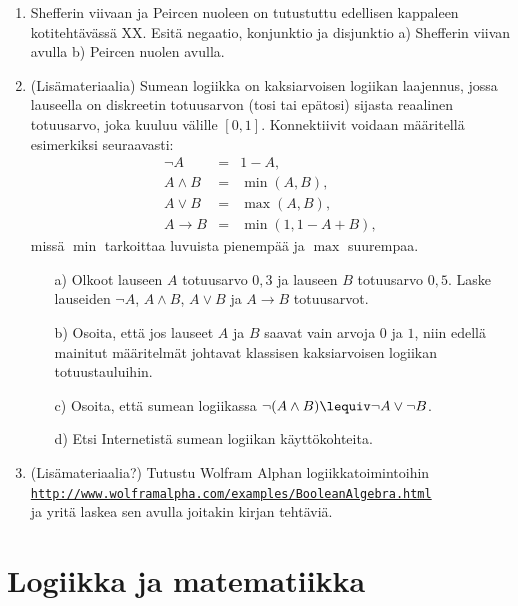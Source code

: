 \begin{enumerate}
\item Shefferin viivaan ja Peircen nuoleen on tutustuttu
edellisen kappaleen kotitehtävässä XX. Esitä negaatio,
konjunktio ja disjunktio a) Shefferin viivan avulla b)
Peircen nuolen avulla.

\item (Lisämateriaalia) Sumean logiikka on kaksiarvoisen logiikan
laajennus, jossa lauseella on diskreetin totuusarvon
(tosi tai epätosi) sijasta reaalinen totuusarvo, joka
kuuluu välille $[0,1]$. Konnektiivit voidaan määritellä
esimerkiksi seuraavasti:
\[
\begin{array}{rcl}
\lnot A &=& 1-A,\\
A\land B &=& \min(A,B),\\
A\lor B &=& \max(A,B),\\
A\to B
&=& \min(1,1-A+B),
\end{array}
\]
missä $\min$ tarkoittaa luvuista pienempää ja $\max$
suurempaa.

\begin{itemize}
\item[a)] Olkoot lauseen $A$ totuusarvo $0,3$ ja lauseen
$B$ totuusarvo $0,5$. Laske lauseiden $\lnot A$, $A\land
B$, $A\lor B$ ja $A \to B$ totuusarvot.
\item[b)] Osoita, että jos lauseet $A$ ja $B$ saavat
vain arvoja $0$ ja $1$, niin edellä mainitut määritelmät johtavat
klassisen kaksiarvoisen logiikan totuustauluihin.
\item[c)] Osoita, että sumean logiikassa $\lnot(A\land B)
\lequiv \lnot A \lor \lnot B$.
\item[d)] Etsi Internetistä sumean logiikan
käyttökohteita.
\end{itemize}

\item (Lisämateriaalia?) Tutustu Wolfram Alphan
logiikkatoimintoihin\\
\href{http://www.wolframalpha.com/examples/BooleanAlgebra.html}{{\tt http://www.wolframalpha.com/examples/BooleanAlgebra.html}}\\
ja yritä laskea sen avulla joitakin kirjan tehtäviä.


\end{enumerate}

\newpage

\chapter{Logiikka ja matematiikka}

